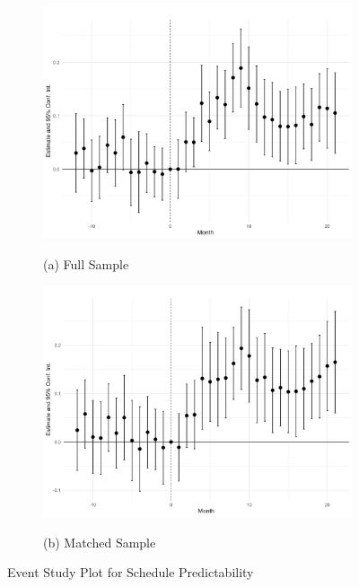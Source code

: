 \documentclass[letterpaper,11pt,leqno]{article}
\theoremstyle{paper}
\begin{document}
\begin{figure}[h]
\centering
\begin{subfigure}{.48\textwidth}
  \centering
  \caption*{(a) Full Sample}
  \includegraphics[scale=0.11]{Figures_Revision_2/advance_notice_es_new.jpeg}
  \label{f:event_study_workers_a}
\end{subfigure}%
\begin{subfigure}{.48\textwidth}
  \centering
  \caption*{(b) Matched Sample}
  \includegraphics[scale=0.11]{Figures_Revision_2/advance_notice_es_matched_new_v3.jpeg}
  \label{f:event_study_workers_b}
\end{subfigure}
\caption{Event Study Plot for Schedule Predictability}
\vspace{-0.50cm}

\end{figure}
\end{document}
